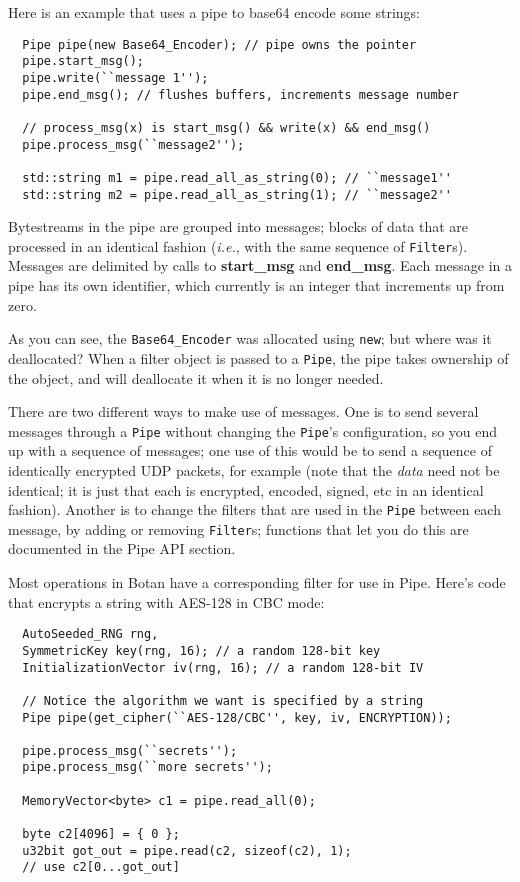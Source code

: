 \documentclass{article}
\newcommand{\function}[1]{\textbf{#1}}
\newcommand{\keyword}[1]{\texttt{#1}}
\newcommand{\type}[1]{\texttt{#1}}
\newcommand{\ie}[0]{\emph{i.e.}}
\begin{document}
Here is an example that uses a pipe to base64 encode some strings:

\begin{verbatim}
  Pipe pipe(new Base64_Encoder); // pipe owns the pointer
  pipe.start_msg();
  pipe.write(``message 1'');
  pipe.end_msg(); // flushes buffers, increments message number

  // process_msg(x) is start_msg() && write(x) && end_msg()
  pipe.process_msg(``message2'');

  std::string m1 = pipe.read_all_as_string(0); // ``message1''
  std::string m2 = pipe.read_all_as_string(1); // ``message2''
\end{verbatim}

Bytestreams in the pipe are grouped into messages; blocks of data that
are processed in an identical fashion (\ie, with the same sequence of
\type{Filter}s). Messages are delimited by calls to
\function{start\_msg} and \function{end\_msg}. Each message in a pipe
has its own identifier, which currently is an integer that increments
up from zero.

As you can see, the \type{Base64\_Encoder} was allocated using
\keyword{new}; but where was it deallocated? When a filter object is
passed to a \type{Pipe}, the pipe takes ownership of the object, and
will deallocate it when it is no longer needed.

There are two different ways to make use of messages. One is to send
several messages through a \type{Pipe} without changing the
\type{Pipe}'s configuration, so you end up with a sequence of
messages; one use of this would be to send a sequence of identically
encrypted UDP packets, for example (note that the \emph{data} need not
be identical; it is just that each is encrypted, encoded, signed, etc
in an identical fashion). Another is to change the filters that are
used in the \type{Pipe} between each message, by adding or removing
\type{Filter}s; functions that let you do this are documented in the
Pipe API section.

Most operations in Botan have a corresponding filter for use in Pipe.
Here's code that encrypts a string with AES-128 in CBC mode:

\begin{verbatim}
  AutoSeeded_RNG rng,
  SymmetricKey key(rng, 16); // a random 128-bit key
  InitializationVector iv(rng, 16); // a random 128-bit IV

  // Notice the algorithm we want is specified by a string
  Pipe pipe(get_cipher(``AES-128/CBC'', key, iv, ENCRYPTION));

  pipe.process_msg(``secrets'');
  pipe.process_msg(``more secrets'');

  MemoryVector<byte> c1 = pipe.read_all(0);

  byte c2[4096] = { 0 };
  u32bit got_out = pipe.read(c2, sizeof(c2), 1);
  // use c2[0...got_out]
\end{verbatim}
\end{document}
